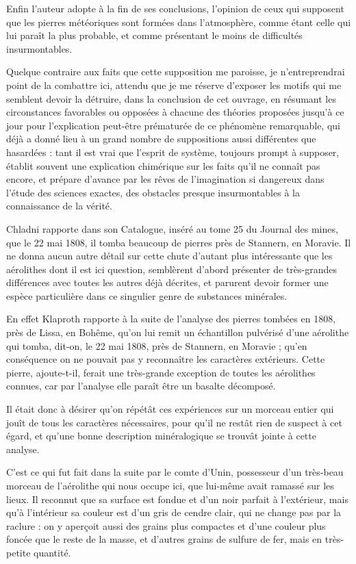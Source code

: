 \documentclass[a4paper, 12pt, oneside, french]{article}
\begin{document}
Enfin l'auteur adopte à la fin de ses conclusions, l'opinion de ceux qui supposent que les pierres météoriques sont formées dans l'atmosphère, comme étant celle qui lui paraît la plus probable, et comme présentant le moins de difficultés insurmontables.

Quelque contraire aux faits que cette supposition me paroisse, je n'entreprendrai point de la combattre ici, attendu que je me réserve d'exposer les motifs qui me semblent devoir la détruire, dans la conclusion de cet ouvrage, en résumant les circonstances favorables ou opposées à chacune des théories proposées jusqu'à ce jour pour l'explication peut-être prématurée de ce phénomène remarquable, qui déjà a donné lieu à un grand nombre de suppositions aussi différentes que hasardées : tant il est vrai que l'esprit de système, toujours prompt à supposer, établit souvent une explication chimérique sur les faits qu'il ne connaît pas encore, et prépare d'avance par les rêves de l'imagination si dangereux dans l'étude des sciences exactes, des obstacles presque insurmontables à la connaissance de la vérité.

Chladni rapporte dans son Catalogue, inséré au tome 25 du Journal des mines, que le 22 mai 1808, il tomba beaucoup de pierres près de Stannern, en Moravie. Il ne donna aucun autre détail sur cette chute d'autant plus intéressante que les aérolithes dont il est ici question, semblèrent d'abord présenter de très-grandes différences avec toutes les autres déjà décrites, et parurent devoir former une espèce particulière dans ce singulier genre de substances minérales.

En effet Klaproth rapporte à la suite de l'analyse des pierres tombées en 1808, près de Lissa, en Bohême, qu'on lui remit un échantillon pulvérisé d'une aérolithe qui tomba, dit-on, le 22 mai 1808, près de Stannern, en Moravie ; qu'en conséquence on ne pouvait pas y reconnaître les caractères extérieurs. Cette pierre, ajoute-t-il, ferait une très-grande exception de toutes les aérolithes connues, car par l'analyse elle paraît être un basalte décomposé.

Il était donc à désirer qu'on répétât ces expériences sur un morceau entier qui jouît de tous les caractères nécessaires, pour qu'il ne restât rien de suspect à cet égard, et qu'une bonne description minéralogique se trouvât jointe à cette analyse.

C'est ce qui fut fait dans la suite par le comte d'Unin, possesseur d'un très-beau morceau de l'aérolithe qui nous occupe ici, que lui-même avait ramassé sur les lieux. Il reconnut que sa surface est fondue et d'un noir parfait à l'extérieur, mais qu'à l'intérieur sa couleur est d'un gris de cendre clair, qui ne change pas par la raclure : on y aperçoit aussi des grains plus compactes et d'une couleur plus foncée que le reste de la masse, et d'autres grains de sulfure de fer, mais en très-petite quantité.
\end{document}
